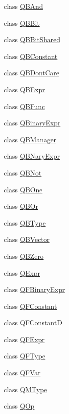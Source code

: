 \begin{DoxyCompactItemize}
\item 
class \hyperlink{classQuickMath_1_1QBAnd}{Q\+B\+And}
\item 
class \hyperlink{classQuickMath_1_1QBBit}{Q\+B\+Bit}
\item 
class \hyperlink{classQuickMath_1_1QBBitShared}{Q\+B\+Bit\+Shared}
\item 
class \hyperlink{classQuickMath_1_1QBConstant}{Q\+B\+Constant}
\item 
class \hyperlink{classQuickMath_1_1QBDontCare}{Q\+B\+Dont\+Care}
\item 
class \hyperlink{classQuickMath_1_1QBExpr}{Q\+B\+Expr}
\item 
class \hyperlink{classQuickMath_1_1QBFunc}{Q\+B\+Func}
\item 
class \hyperlink{classQuickMath_1_1QBinaryExpr}{Q\+Binary\+Expr}
\item 
class \hyperlink{classQuickMath_1_1QBManager}{Q\+B\+Manager}
\item 
class \hyperlink{classQuickMath_1_1QBNaryExpr}{Q\+B\+Nary\+Expr}
\item 
class \hyperlink{classQuickMath_1_1QBNot}{Q\+B\+Not}
\item 
class \hyperlink{classQuickMath_1_1QBOne}{Q\+B\+One}
\item 
class \hyperlink{classQuickMath_1_1QBOr}{Q\+B\+Or}
\item 
class \hyperlink{classQuickMath_1_1QBType}{Q\+B\+Type}
\item 
class \hyperlink{classQuickMath_1_1QBVector}{Q\+B\+Vector}
\item 
class \hyperlink{classQuickMath_1_1QBZero}{Q\+B\+Zero}
\item 
class \hyperlink{classQuickMath_1_1QExpr}{Q\+Expr}
\item 
class \hyperlink{classQuickMath_1_1QFBinaryExpr}{Q\+F\+Binary\+Expr}
\item 
class \hyperlink{classQuickMath_1_1QFConstant}{Q\+F\+Constant}
\item 
class \hyperlink{classQuickMath_1_1QFConstantD}{Q\+F\+Constant\+D}
\item 
class \hyperlink{classQuickMath_1_1QFExpr}{Q\+F\+Expr}
\item 
class \hyperlink{classQuickMath_1_1QFType}{Q\+F\+Type}
\item 
class \hyperlink{classQuickMath_1_1QFVar}{Q\+F\+Var}
\item 
class \hyperlink{classQuickMath_1_1QMType}{Q\+M\+Type}
\item 
class \hyperlink{classQuickMath_1_1QOp}{Q\+Op}
\end{DoxyCompactItemize}
